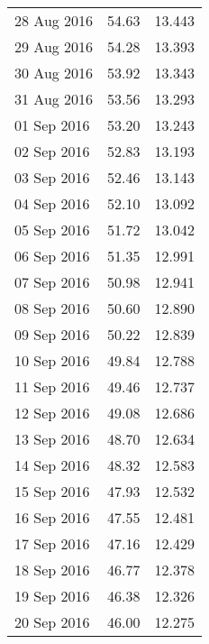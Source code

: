 \documentclass[11pt,a4paper,twoside]{article}
\begin{document}
\begin{longtable}{lcc}
28 Aug 2016                    & 54.63                & 13.443     \\
29 Aug 2016                    & 54.28                & 13.393     \\
30 Aug 2016                    & 53.92                & 13.343     \\
31 Aug 2016                    & 53.56                & 13.293     \\
01 Sep 2016                    & 53.20                & 13.243     \\
02 Sep 2016                    & 52.83                & 13.193     \\
03 Sep 2016                    & 52.46                & 13.143     \\
04 Sep 2016                    & 52.10                & 13.092     \\
05 Sep 2016                    & 51.72                & 13.042     \\
06 Sep 2016                    & 51.35                & 12.991     \\
07 Sep 2016                    & 50.98                & 12.941     \\
08 Sep 2016                    & 50.60                & 12.890     \\
09 Sep 2016                    & 50.22                & 12.839     \\
10 Sep 2016                    & 49.84                & 12.788     \\
11 Sep 2016                    & 49.46                & 12.737     \\
12 Sep 2016                    & 49.08                & 12.686     \\
13 Sep 2016                    & 48.70                & 12.634     \\
14 Sep 2016                    & 48.32                & 12.583     \\
15 Sep 2016                    & 47.93                & 12.532     \\
16 Sep 2016                    & 47.55                & 12.481     \\
17 Sep 2016                    & 47.16                & 12.429     \\
18 Sep 2016                    & 46.77                & 12.378     \\
19 Sep 2016                    & 46.38                & 12.326     \\
20 Sep 2016                    & 46.00                & 12.275     \\

\end{longtable}
\end{document}
